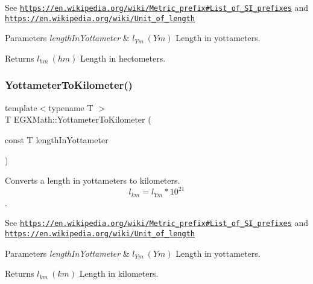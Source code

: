 See \href{https://en.wikipedia.org/wiki/Metric_prefix#List_of_SI_prefixes}{\tt https\+://en.\+wikipedia.\+org/wiki/\+Metric\+\_\+prefix\#\+List\+\_\+of\+\_\+\+S\+I\+\_\+prefixes} and \href{https://en.wikipedia.org/wiki/Unit_of_length}{\tt https\+://en.\+wikipedia.\+org/wiki/\+Unit\+\_\+of\+\_\+length} 
\begin{DoxyParams}{Parameters}
{\em length\+In\+Yottameter} & $ l_{Ym}\ (Ym)$ Length in yottameters. \\
\hline
\end{DoxyParams}
\begin{DoxyReturn}{Returns}
$ l_{hm}\ (hm)$ Length in hectometers. 
\end{DoxyReturn}
\mbox{\label{group___e_g_x_math-_conversions-_length_conversions-_yottameter-_s_i_ga3de441b3e33fe175b75425711d1b92e1}} 
\subsubsection{\texorpdfstring{Yottameter\+To\+Kilometer()}{YottameterToKilometer()}}
{\footnotesize\ttfamily template$<$typename T $>$ \\
T E\+G\+X\+Math\+::\+Yottameter\+To\+Kilometer (\begin{DoxyParamCaption}\item[{const T}]{length\+In\+Yottameter }\end{DoxyParamCaption})}



Converts a length in yottameters to kilometers. \[ l_{km}=l_{Ym} * 10^{21} \]. 

See \href{https://en.wikipedia.org/wiki/Metric_prefix#List_of_SI_prefixes}{\tt https\+://en.\+wikipedia.\+org/wiki/\+Metric\+\_\+prefix\#\+List\+\_\+of\+\_\+\+S\+I\+\_\+prefixes} and \href{https://en.wikipedia.org/wiki/Unit_of_length}{\tt https\+://en.\+wikipedia.\+org/wiki/\+Unit\+\_\+of\+\_\+length} 
\begin{DoxyParams}{Parameters}
{\em length\+In\+Yottameter} & $ l_{Ym}\ (Ym)$ Length in yottameters. \\
\hline
\end{DoxyParams}
\begin{DoxyReturn}{Returns}
$ l_{km}\ (km)$ Length in kilometers. 
\end{DoxyReturn}
\mbox{\label{group___e_g_x_math-_conversions-_length_conversions-_yottameter-_s_i_ga6c00035c9e60ba95c4670d34aef3ec2a}} 
